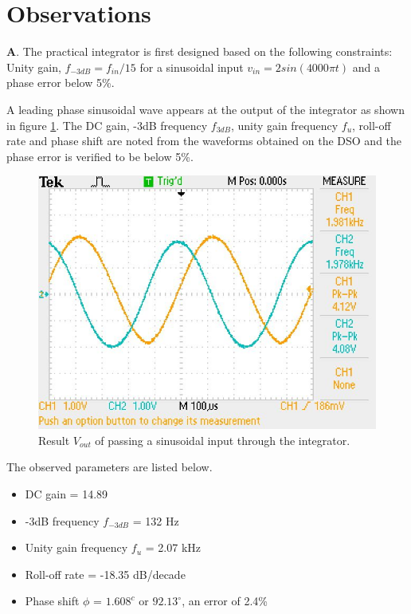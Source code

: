 \documentclass[12pt, titlepage]{article}
\theoremstyle{definition}
\begin{document}
  \newpage
  \section{Observations}
    \textbf{A}. The practical integrator is first designed based on the following constraints:
    Unity gain, $f_{-3dB} = f_{in}/15$ for a sinusoidal input
    $v_{in} = 2 sin(4000\pi t)$ and a phase error below 5\%.

    A leading phase sinusoidal wave appears at the output of the integrator as shown in figure \ref{fig:results_q1}.
    The DC gain, -3dB frequency $f_{3dB}$, unity gain frequency $f_u$, roll-off rate and phase shift are noted from the waveforms obtained on the DSO and the phase error is verified to be below 5\%.

    \begin{figure}[h]
      \centering
      \includegraphics[scale=0.5]{images/results_q1.jpeg}
      \caption{Result \color{cyan}$V_{out}$ \color{black}of passing a sinusoidal input  \color{black}through the integrator.}
      \label{fig:results_q1}
    \end{figure}

    The observed parameters are listed below.
    \begin{itemize}
      \item[] DC gain = 14.89
      \item[] -3dB frequency $f_{-3dB}$ = 132 Hz
      \item[] Unity gain frequency $f_u$ = 2.07 kHz
      \item[] Roll-off rate = -18.35 dB/decade
      \item[] Phase shift $\phi$ = $1.608^{c}$ or $92.13^{\circ}$, an error of 2.4\%
    \end{itemize}
\end{document}
